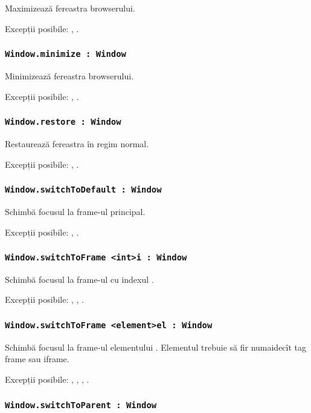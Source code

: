 Maximizează fereastra browserului.

Excepții posibile: , .

\subsubsection{\lstinline|Window.minimize : Window|}

Minimizează fereastra browserului.

Excepții posibile: , .

\subsubsection{\lstinline|Window.restore : Window|}

Restaurează fereastra în regim normal.

Excepții posibile: , .

\subsubsection{\lstinline|Window.switchToDefault : Window|}

Schimbă focusul la frame-ul principal.

Excepții posibile: , .

\subsubsection{\lstinline|Window.switchToFrame <int>i : Window|}

Schimbă focusul la frame-ul cu indexul .

Excepții posibile: , , .

\subsubsection{\lstinline|Window.switchToFrame <element>el : Window|}

Schimbă focusul la frame-ul elementului . Elementul trebuie să fir numaidecît tag frame sau iframe.

Excepții posibile: , , , .

\subsubsection{\lstinline|Window.switchToParent : Window|}

